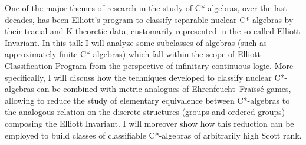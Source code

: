 \documentclass[bsl,meeting]{asl}
\def\urladdr#1{\endgraf\noindent{\it URL Address}: {\tt #1}.}
\newcommand{\NP}{}
\begin{document}
\thispagestyle{empty}


\NP%
%
%
%
%


One of the major themes of research in the study of C*-algebras, over the last decades, has been Elliott’s program to classify separable nuclear C*-algebras by their tracial and K-theoretic data, customarily represented in the so-called Elliott Invariant. In this talk I will analyze some subclasses of algebras (such as approximately finite C*-algebras) which fall within the scope of Elliott Classification Program from the perspective of infinitary continuous logic. More specifically, I will discuss how the techniques developed to classify nuclear C*-algebras can be combined with metric analogues of Ehrenfeucht–Fra\"iss\'e games, allowing to reduce the study of elementary equivalence between C*-algebras to the analogous relation on the discrete structures (groups and ordered groups) composing the Elliott Invariant. I will moreover show how this reduction can be employed to build classes of classifiable C*-algebras of arbitrarily high Scott rank.
\end{document}
